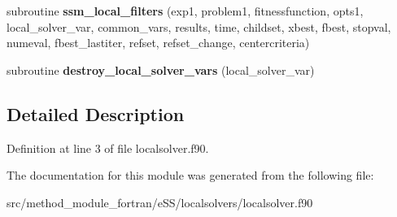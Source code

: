 \begin{DoxyCompactItemize}
\item 
\hypertarget{classlocalsolver_a75ec4313263477f33e42fd6293a97a77}{subroutine {\bfseries ssm\-\_\-local\-\_\-filters} (exp1, problem1, fitnessfunction, opts1, local\-\_\-solver\-\_\-var, common\-\_\-vars, results, time, childset, xbest, fbest, stopval, numeval, fbest\-\_\-lastiter, refset, refset\-\_\-change, centercriteria)}\label{classlocalsolver_a75ec4313263477f33e42fd6293a97a77}

\item 
\hypertarget{classlocalsolver_ad7070c879d32059d0f4398beccebfd9e}{subroutine {\bfseries destroy\-\_\-local\-\_\-solver\-\_\-vars} (local\-\_\-solver\-\_\-var)}\label{classlocalsolver_ad7070c879d32059d0f4398beccebfd9e}

\end{DoxyCompactItemize}


\subsection{Detailed Description}


Definition at line 3 of file localsolver.\-f90.



The documentation for this module was generated from the following file\-:\begin{DoxyCompactItemize}
\item 
src/method\-\_\-module\-\_\-fortran/e\-S\-S/localsolvers/localsolver.\-f90\end{DoxyCompactItemize}
